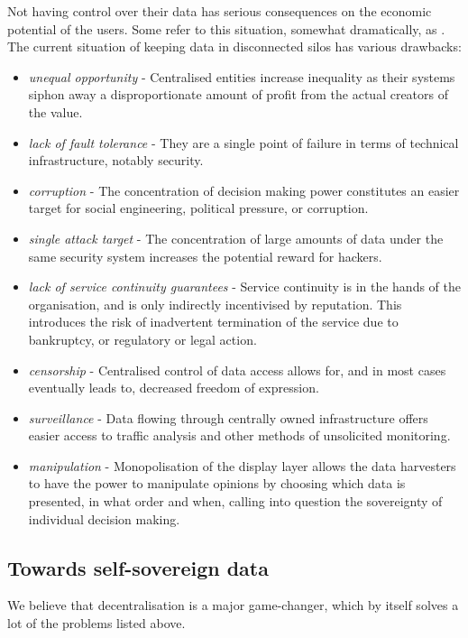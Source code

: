 Not having control over their data has serious consequences on the economic potential of the users. Some refer to this situation, somewhat dramatically, as . 
The current situation of keeping data in disconnected silos has various drawbacks: 

\begin{itemize}
    \item \emph{unequal opportunity} - Centralised entities increase inequality as their systems siphon away a disproportionate amount of profit from the actual creators of the value.
    \item \emph{lack of fault tolerance} - They are a single point of failure in terms of technical infrastructure, notably security.
    \item \emph{corruption} - The concentration of decision making power constitutes an easier target for social engineering, political pressure, or corruption.
    \item \emph{single attack target} - The concentration of large amounts of data under the same security system increases the potential reward for hackers. 
    \item \emph{lack of service continuity guarantees} - Service continuity is in the hands of the organisation, and is only indirectly incentivised by reputation. This introduces the risk of inadvertent termination of the service due to bankruptcy, or regulatory or legal action.
    \item \emph{censorship} - Centralised control of data access allows for, and in most cases eventually leads to, decreased freedom of expression.
    \item \emph{surveillance} - Data flowing through centrally owned infrastructure offers easier access to traffic analysis and other methods of unsolicited monitoring.
    \item \emph{manipulation} - Monopolisation of the display layer allows the data harvesters to have the power to manipulate opinions by choosing which data is presented, in what order and when, calling into question the sovereignty of individual decision making.
\end{itemize}


\subsection{Towards self-sovereign data \statusgreen} \label{sec:selfsovereigndata}

We believe that decentralisation is a major game-changer, which by itself solves a lot of the problems listed above.

